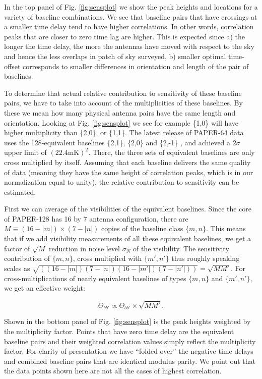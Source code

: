 \documentclass[twocolumn,apj,numberedappendix]{emulateapj}
\renewcommand\[{\begin{equation}}
\renewcommand\]{\end{equation}}
\begin{document}
In the top panel of Fig. \ref{fig:sensplot}
we show the peak heights and locations for a variety of baseline combinations.
We see that baseline pairs that have crossings at a smaller time delay
tend to have higher correlations. In other words, correlation peaks
that are closer to zero time lag are higher. This is expected since
a) the longer the time delay, the more the antennas have moved with respect
to the sky and hence the less overlaps in patch of sky surveyed, b) smaller optimal
time-offset corresponds to smaller differences in orientation and length of the 
pair of baselines. 




To determine that actual relative contribution to sensitivity of these
baseline pairs, we have to take into account of the multiplicities of
these baselines. By these we mean how many physical antenna pairs have the
same length and orientation. Looking at Fig. \ref{fig:sensplot}
we see for example \{1,0\} will have higher multiplicity than \{2,0\},
or \{1,1\}. The latest release of PAPER-64 data uses the 128-equivalent baselines \{2,1\},
\{2,0\} and \{2,-1\} \citep{Ali2015}, and achieved a $2\sigma$ upper
limit of $(22.4\text{mK})^{2}$. There, the three sets of equivalent baselines
are only cross multiplied by itself. Assuming that each baseline delivers
the same quality of data (meaning they have the same height of correlation
peaks, which is in our normalization equal to unity), the relative
contribution to sensitivity can be estimated. 

First we can average of the visibilities of the equivalent baselines. Since the core of PAPER-128 has 16 by 7 antenna configuration, there
are $M\equiv(16-|m|)\times(7-|n|)$ copies of the baseline class $\{m,n\}$. This means
that if we add visibility measurements of all these equivalent baselines,
we get a factor of $\sqrt{M}$ reduction in noise
level $\sigma_N$ of the visibility. The sensitivity contribution of $\{m,n\}$, cross multiplied with $\{m',n'\}$  thus roughly speaking scales as $\sqrt{\left((16-|m|)(7-|n|)(16-|m'|)(7-|n'|)\right)}=\sqrt{MM'}$.
For cross-multiplications of nearly equivalent baselines of
types $\{m,n\}$ and $\{m',n'\}$, we get an effective weight: 

\begin{equation}
\widetilde{\Theta}_{bb'} \propto \Theta_{bb'}\times\sqrt{MM'}.\label{eq:sensul}
\end{equation}

Shown in the bottom panel of Fig. \ref{fig:sensplot} is the peak heights weighted
by the multiplicity factor. Points that have zero time delay are the equivalent baseline pairs and their weighted correlation values simply reflect the multiplicity factor. For clarity of presentation we have ``folded over'' the negative time delays and combined baseline pairs that are identical modulus parity. We point out that the data points shown here are not all the cases of highest correlation.  
\end{document}

